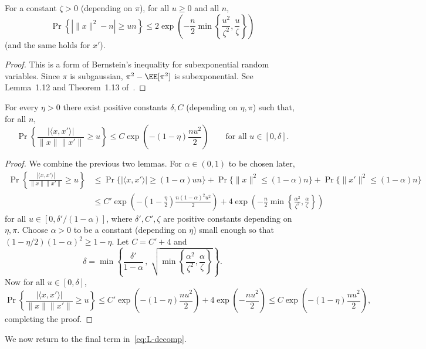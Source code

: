\documentclass[11pt]{article}
\begin{document}
\begin{lemma}
For a constant $\zeta > 0$ (depending on $\pi$), for all $u \ge 0$ and all $n$,
\[ \Pr\left\{\left|\|x\|^2 - n\right| \ge un\right\} \le 2 \exp\left(-\frac{n}{2} \min\left\{\frac{u^2}{\zeta^2},\frac{u}{\zeta}\right\}\right) \]
(and the same holds for $x'$).
\end{lemma}
\begin{proof}
This is a form of Bernstein's inequality for subexponential random variables. Since $\pi$ is subgaussian, $\pi^2 - \EE[\pi^2]$ is subexponential. See Lemma~1.12 and Theorem~1.13 of~\cite{rig-notes}.
\end{proof}

\begin{lemma}\label{lem:ov-conc}
For every $\eta > 0$ there exist positive constants $\delta,C$ (depending on $\eta,\pi$) such that, for all $n$,
\[ \Pr\left\{\frac{|\langle x,x' \rangle|}{\|x\| \|x'\|} \ge u\right\} \le C \exp\left(-(1-\eta)\frac{nu^2}{2}\right) \qquad \text{for all } u \in [0,\delta]. \]
\end{lemma}
\begin{proof}
We combine the previous two lemmas. For $\alpha \in (0,1)$ to be chosen later,
\begin{align*}
\Pr\left\{\frac{|\langle x,x' \rangle|}{\|x\| \|x'\|} \ge u\right\} &\le \Pr\{|\langle x,x' \rangle| \ge (1-\alpha)un\} + \Pr\{\|x\|^2 \le (1-\alpha)n\} + \Pr\{\|x'\|^2 \le (1-\alpha)n\} \\
&\le C' \exp\left(-\left(1-\frac{\eta}{2}\right)\frac{n(1-\alpha)^2 u^2}{2}\right) + 4\exp\left(-\frac{n}{2} \min\left\{\frac{\alpha^2}{\zeta^2},\frac{\alpha}{\zeta}\right\}\right)
\end{align*}
for all $u \in [0,\delta'/(1-\alpha)]$, where $\delta',C',\zeta$ are positive constants depending on $\eta,\pi$. Choose $\alpha > 0$ to be a constant (depending on $\eta$) small enough so that $(1-\eta/2)(1-\alpha)^2 \ge 1-\eta$. Let $C = C'+4$ and
\[ \delta = \min\left\{\frac{\delta'}{1-\alpha} \,,\; \sqrt{\min\left\{\frac{\alpha^2}{\zeta^2},\frac{\alpha}{\zeta}\right\}}\right\}. \]
Now for all $u \in [0,\delta]$,
\[ \Pr\left\{\frac{|\langle x,x' \rangle|}{\|x\| \|x'\|} \ge u\right\} \le C'\exp\left(-(1-\eta)\frac{nu^2}{2}\right) + 4\exp\left(-\frac{nu^2}{2}\right) \le C\exp\left(-(1-\eta)\frac{nu^2}{2}\right), \]
completing the proof.
\end{proof}

We now return to the final term in~\eqref{eq:L-decomp}.
\end{document}
